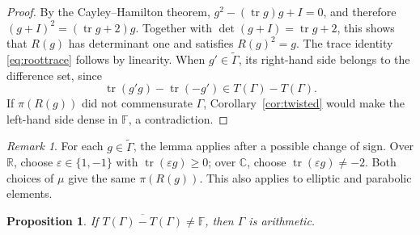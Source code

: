\documentclass[reqno]{amsart}
\newtheorem{proposition}[theorem]{Proposition}
\theoremstyle{remark}
\newtheorem{remark}[theorem]{Remark}
\DeclareMathOperator{\tr}{tr}
\newcommand{\R}{\mathbb R}
\newcommand{\C}{\mathbb C}
\newcommand{\F}{\mathbb F}
\newcommand{\G}{\widetilde\Gamma}
\begin{document}
\begin{proof}
By the Cayley--Hamilton theorem, $g^2-(\tr g)g+I=0$, and therefore $(g+I)^2=(\tr g+2)g$. Together with $\det(g+I)=\tr g+2$, this shows that $R(g)$ has determinant one and satisfies $R(g)^2=g$. The trace identity \eqref{eq:roottrace} follows by linearity. When $g'\in\G$, its right-hand side belongs to the difference set, since
$$
\tr(g' g)-\tr(-g')\in T(\Gamma)-T(\Gamma).
$$
If $\pi(R(g))$ did not commensurate $\Gamma$, Corollary~\ref{cor:twisted} would make the left-hand side dense in $\F$, a contradiction.
\end{proof}

\begin{remark}\label{rem:sign}
For each $g\in\G$, the lemma applies after a possible change of sign. Over $\R$, choose $\varepsilon\in\{1,-1\}$ with $\tr(\varepsilon g)\ge0$; over $\C$, choose $\tr(\varepsilon g)\ne-2$. Both choices of $\mu$ give the same $\pi(R(g))$. This also applies to elliptic and parabolic elements.
\end{remark}

\begin{proposition}\label{prop:arith}
If $\overline{T(\Gamma)-T(\Gamma)}\ne\F$, then $\Gamma$ is arithmetic.
\end{proposition}
\end{document}
